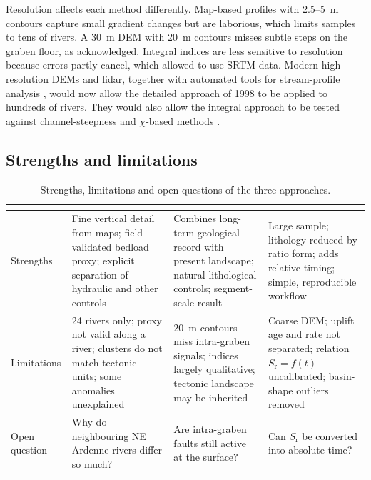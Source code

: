 \documentclass[10pt,a4paper,twocolumn]{article}
\begin{document}
Resolution affects each method differently. Map-based profiles with 2.5--5~m contours capture small
gradient changes but are laborious, which limits samples to tens of rivers. A 30~m DEM with 20~m
contours misses subtle steps on the graben floor, as \citet{PetersVanBalen2007} acknowledged. Integral
indices are less sensitive to resolution because errors partly cancel, which allowed
\citet{Demoulin2011} to use SRTM data. Modern high-resolution DEMs and lidar, together with automated
tools for stream-profile analysis \citep{SchwanghartScherler2014}, would now allow the detailed
approach of 1998 to be applied to hundreds of rivers. They would also allow the integral approach to be
tested against channel-steepness and $\chi$-based methods \citep{Wobus2006,PerronRoyden2013}.

\subsection{Strengths and limitations}

\begin{table}[t]
\centering
\caption{Strengths, limitations and open questions of the three approaches.}
\label{tab:appraisal}
\footnotesize
\begin{tabularx}{\textwidth}{@{}P{2.4cm}LLL@{}}
\toprule
& \textbf{\citet{Demoulin1998}} & \textbf{\citet{PetersVanBalen2007}} & \textbf{\citet{Demoulin2011}}\\
\midrule
Strengths & Fine vertical detail from maps; field-validated bedload proxy; explicit separation of hydraulic and other controls & Combines long-term geological record with present landscape; natural lithological controls; segment-scale result & Large sample; lithology reduced by ratio form; adds relative timing; simple, reproducible workflow\\
Limitations & 24 rivers only; proxy not valid along a river; clusters do not match tectonic units; some anomalies unexplained & 20~m contours miss intra-graben signals; indices largely qualitative; tectonic landscape may be inherited & Coarse DEM; uplift age and rate not separated; relation $S_\mathrm{r}=f(t)$ uncalibrated; basin-shape outliers removed\\
Open question & Why do neighbouring NE Ardenne rivers differ so much? & Are intra-graben faults still active at the surface? & Can $S_\mathrm{r}$ be converted into absolute time?\\
\bottomrule
\end{tabularx}
\end{table}
\end{document}
